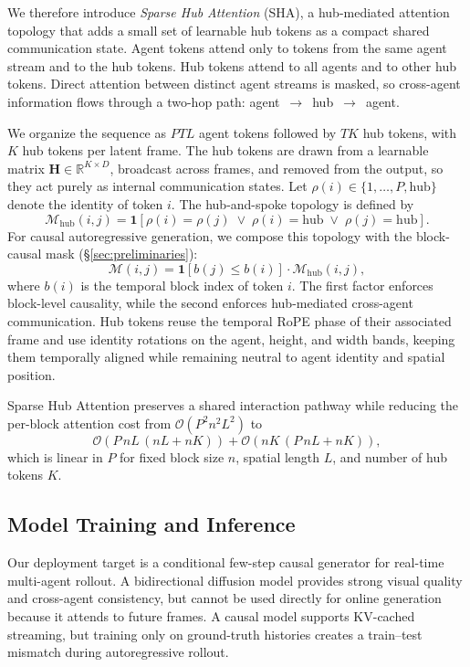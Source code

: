 We therefore introduce \emph{Sparse Hub Attention} (SHA), a hub-mediated attention topology that adds a small set of learnable hub tokens as a compact shared communication state.
Agent tokens attend only to tokens from the same agent stream and to the hub tokens.
Hub tokens attend to all agents and to other hub tokens.
Direct attention between distinct agent streams is masked, so cross-agent information flows through a two-hop path: agent~$\rightarrow$~hub~$\rightarrow$~agent.


We organize the sequence as $PTL$ agent tokens followed by $TK$ hub tokens, with $K$ hub tokens per latent frame.
The hub tokens are drawn from a learnable matrix $\mathbf{H}\in\mathbb{R}^{K\times D}$, broadcast across frames, and removed from the output, so they act purely as internal communication states.
Let $\rho(i)\in\{1,\ldots,P,\mathrm{hub}\}$ denote the identity of token $i$.
The hub-and-spoke topology is defined by
\begin{equation}
\mathcal{M}_{\mathrm{hub}}(i,j)
=
\mathbf{1}\!\left[
\rho(i)=\rho(j)
\;\vee\;
\rho(i)=\mathrm{hub}
\;\vee\;
\rho(j)=\mathrm{hub}
\right].
\end{equation}
For causal autoregressive generation, we compose this topology with the block-causal mask (\S\ref{sec:preliminaries}):
\begin{equation}
\mathcal{M}(i,j)
=
\mathbf{1}\!\left[b(j)\leq b(i)\right]
\cdot
\mathcal{M}_{\mathrm{hub}}(i,j),
\end{equation}
where $b(i)$ is the temporal block index of token $i$.
The first factor enforces block-level causality, while the second enforces hub-mediated cross-agent communication.
Hub tokens reuse the temporal RoPE phase of their associated frame and use identity rotations on the agent, height, and width bands, keeping them temporally aligned while remaining neutral to agent identity and spatial position.

Sparse Hub Attention preserves a shared interaction pathway while reducing the per-block attention cost from $\mathcal{O}(P^2 n^2 L^2)$ to
\begin{equation}
\mathcal{O}\!\left(P\,nL\,(nL+nK)\right)
+
\mathcal{O}\!\left(nK\,(P\,nL+nK)\right),
\end{equation}
which is linear in $P$ for fixed block size $n$, spatial length $L$, and number of hub tokens $K$.


\subsection{Model Training and Inference}
\label{sec:causal-distillation}
Our deployment target is a conditional few-step causal generator for real-time multi-agent rollout.
A bidirectional diffusion model provides strong visual quality and cross-agent consistency, but cannot be used directly for online generation because it attends to future frames.
A causal model supports KV-cached streaming, but training only on ground-truth histories creates a train--test mismatch during autoregressive rollout.

